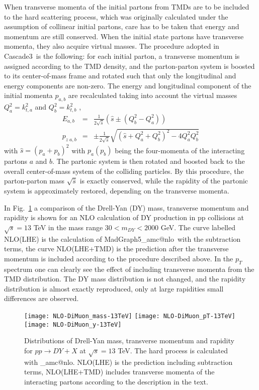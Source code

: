 \documentclass[11pt]{article} \usepackage{mystyle-new}
\makeatletter
\def\shat{\ensuremath{\hat{s}}}
\def\cascade{{\sc Cascade3}}
\def\MGvATNLO{{\sc MadGraph5}\_a{\sc mc@nlo}}
\makeatother
\begin{document}
When transverse momenta of the initial partons from TMDs are to be included to the hard scattering process, which was originally calculated under the assumption of collinear initial partons, care has to be taken that energy and momentum are still conserved. When the initial state partons have transverse momenta, they also acquire virtual masses. 
The procedure adopted in \cascade\ is the following:
for each initial parton, a transverse momentum is assigned according to the TMD density, and the parton-parton system is boosted to its center-of-mass frame and rotated such that only the longitudinal and energy components are non-zero. The energy and longitudinal component of the initial momenta $p_{a,b}$ are recalculated taking into account the virtual masses $Q_a^2=k_{t,a}^2$ and $Q_b^2=k_{t,b}^2$  \cite{Bengtsson:1986gz}, 
\begin{eqnarray}
E_{a,b} &=& \frac{1}{2\sqrt{\shat}} \left( \shat \pm (Q_b^2 - Q_a^2) \right)\\
p_{z\;a,b} & = &  \pm \frac{1}{2\sqrt{\shat}}\sqrt{(\shat + Q_a^2 +Q_b^2)^2 - 4Q_a^2Q_b^2 }
\end{eqnarray}
with $\shat=(p_a + p_b)^2$ with $p_a (p_b)$ being the four-momenta of the interacting partons $a$ and $b$. The partonic system is then rotated and boosted back to the overall center-of-mass system of the colliding particles. By this procedure, the parton-parton mass $\sqrt{\hat{s}}$ is exactly conserved, while the rapidity of the partonic system is approximately restored, depending on the transverse momenta.

In Fig.~\ref{addTMD} a comparison of the Drell-Yan (DY) mass, transverse momentum and rapidity is shown for an NLO calculation of DY production in pp collisions at $\sqrt{s}=13$ TeV in the mass range $30 < m_{DY} < 2000$ GeV. The curve labelled NLO(LHE) is the calculation of  \MGvATNLO\ with the subtraction terms, the curve NLO(LHE+TMD) is the prediction after the transverse momentum is included according to the procedure described above. 
In the $p_T$ spectrum one can clearly see the effect of including transverse momenta from the TMD distribution.
The DY mass distribution is not changed, and the rapidity distribution is almost exactly reproduced, only at large rapidities small differences are observed.

\begin{figure}[htb]
\begin{center} 
\texttt{[image: NLO-DiMuon\_mass-13TeV]}
\texttt{[image: NLO-DiMuon\_pT-13TeV]}
\texttt{[image: NLO-DiMuon\_y-13TeV]}
\caption{Distributions of Drell-Yan mass, transverse momentum and rapidity for $pp \to DY + X$ at $\sqrt{s}=13 $ TeV. The hard process is calculated with \protect\MGvATNLO . NLO(LHE) is the prediction including subtraction terms, NLO(LHE+TMD) includes transverse momenta of the interacting partons according to the description in the text.}
\label{addTMD}
\end{center}
\end{figure} 
\end{document}
